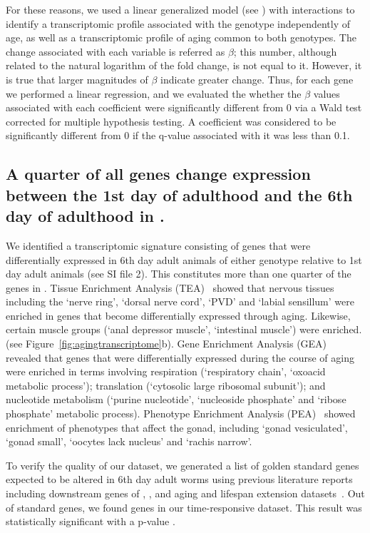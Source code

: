 For these reasons, we used a linear generalized model (see )
with interactions to identify a transcriptomic profile associated with the
\fog{} genotype independently of age, as well as a transcriptomic profile of
\cel{} aging common to both genotypes. The change associated with each variable
is referred as $\beta$; this number, although related to the natural logarithm
of the fold change, is not equal to it. However, it is true that larger
magnitudes of $\beta$ indicate greater change. Thus, for each gene we performed
a linear regression, and we evaluated the whether the $\beta$ values associated
with each coefficient were significantly different from 0 via a Wald test
corrected for multiple hypothesis testing. A coefficient was considered to be
significantly different from 0 if the q-value associated with it was less than
0.1.

\subsection*{A quarter of all genes change expression between the 1st day of
             adulthood and the 6th day of adulthood in \cel{}.}
We identified a transcriptomic signature consisting of \agen{} genes that were
differentially expressed in 6th day adult animals of either genotype relative
to 1st day adult animals (see SI file 2). This constitutes more than one quarter
of the genes in \cel{}. Tissue Enrichment Analysis (TEA)~\citep{Angeles-Albores2016}
showed that nervous tissues including the `nerve ring', `dorsal nerve cord', `PVD'
and `labial sensillum' were enriched in genes that become differentially expressed
through aging. Likewise, certain muscle groups (`anal depressor muscle', `intestinal
muscle') were enriched. (see Figure~\ref{fig:agingtranscriptome}b). Gene
Enrichment Analysis (GEA)~\citep{Angeles-Albores106369} revealed that genes that
were differentially expressed during the course of aging were enriched in terms
involving respiration (`respiratory chain', `oxoacid metabolic process');
translation (`cytosolic large ribosomal subunit'); and nucleotide metabolism
(`purine nucleotide', `nucleoside phosphate' and `ribose phosphate' metabolic
process). Phenotype Enrichment Analysis (PEA)~\citep{Angeles-Albores106369} showed
enrichment of phenotypes that affect the \cel{} gonad, including `gonad vesiculated',
`gonad small', `oocytes lack nucleus' and `rachis narrow'.

To verify the quality of our dataset, we generated a list of \goldn{} golden
standard genes expected to be altered in 6th day adult worms using previous
literature reports including downstream genes of , ,
and aging and lifespan extension datasets~\citep{Murphy2003,Halaschek-wiener2005,
Lund2002,McCormick2012,Eckley2013}. Out of \goldn{} standard genes, we found
\goldfound{} genes in our time-responsive dataset. This result was statistically
significant with a p-value \goldpval{}.

